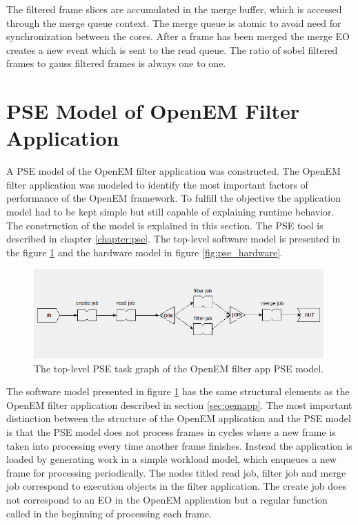 The filtered frame slices are accumulated in the merge buffer, which is accessed
through the merge queue context. The merge queue is atomic to avoid need for
synchronization between the cores. After a frame has been merged the merge EO
creates a new event which is sent to the read queue. The ratio of sobel filtered
frames to gauss filtered frames is always one to one.

\section{PSE Model of OpenEM Filter Application}
\label{sec:pse_model}
A PSE model of the OpenEM filter application was constructed. The OpenEM filter
application was modeled to identify the most important factors of performance of
the OpenEM framework. To fulfill the objective the application model had to be
kept simple but still capable of explaining runtime behavior. The construction
of the model is explained in this section. The PSE tool is described in chapter
\ref{chapter:pse}. The top-level software model is presented in the figure
\ref{fig:pse_application} and the hardware model in figure
\ref{fig:pse_hardware}.

\begin{figure}[h!]
    \begin{center}
        \includegraphics[width=0.99\textwidth]{images/pse_filterapp.png}
        \caption{The top-level PSE task graph of the OpenEM filter app PSE
        model.}
        \label{fig:pse_application}
    \end{center}
\end{figure}

The software model presented in figure \ref{fig:pse_application} has the same
structural elements as the OpenEM filter application described in section
\ref{sec:oemapp}. The most important distinction between the structure of the
OpenEM application and the PSE model is that the PSE model does not process
frames in cycles where a new frame is taken into processing every time another
frame finishes. Instead the application is loaded by generating work in a
simple workload model, which enqueues a new frame for processing periodically.
The nodes titled read job, filter job and merge job correspond to execution
objects in the filter application. The create job does not correspond to an EO
in the OpenEM application but a regular function called in the beginning of
processing each frame.

